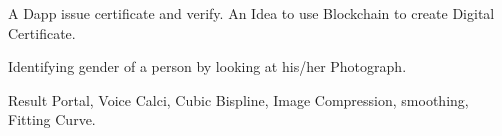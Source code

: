 \documentclass[localFont,alternative,10pt,compact]{main}
\begin{document}
\begin{minipage}[t]{0.66\textwidth}
         
        \noindent
        \hspace{5em}%
        \begin{minipage}{0.85\textwidth\vspace{5pt}}
            A Dapp issue certificate and verify. An Idea to use Blockchain to create Digital Certificate.
        \end{minipage}
         
        \noindent
        \hspace{5em}%
        \begin{minipage}{0.85\textwidth\vspace{5pt}}
            Identifying gender of a person by looking at his/her Photograph.
        \end{minipage}
         
        \noindent
        \hspace{5em}%
        \begin{minipage}{0.85\textwidth\vspace{5pt}}
            Result Portal, Voice Calci, Cubic Bispline, Image Compression, smoothing, Fitting Curve.
        \end{minipage}
    \end{minipage}

    \newpage
    
    
    
\end{document}
